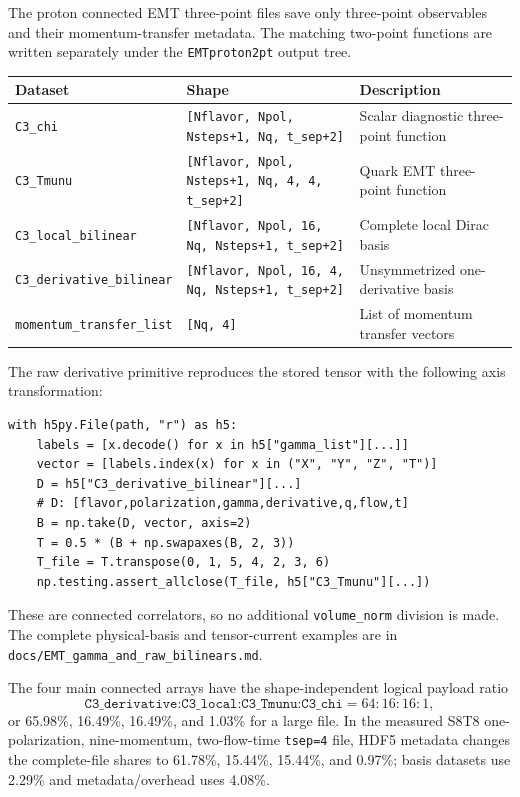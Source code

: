 \documentclass[11pt,a4paper]{article}
\newcommand{\code}[1]{\texttt{#1}}
\begin{document}
The proton connected EMT three-point files save only three-point observables and
their momentum-transfer metadata.  The matching two-point functions are written
separately under the \texttt{EMTproton2pt} output tree.

\begin{center}
\small
\begin{tabular}{p{}p{}p{}}
\toprule
Dataset & Shape & Description \\
\midrule
\texttt{C3\_chi} & \texttt{[Nflavor, Npol, Nsteps+1, Nq, t\_sep+2]}
                  & Scalar diagnostic three-point function \\
\texttt{C3\_Tmunu} & \texttt{[Nflavor, Npol, Nsteps+1, Nq, 4, 4, t\_sep+2]}
                    & Quark EMT three-point function \\
\texttt{C3\_local\_bilinear} & \texttt{[Nflavor, Npol, 16, Nq, Nsteps+1, t\_sep+2]}
                    & Complete local Dirac basis \\
\texttt{C3\_derivative\_bilinear} & \texttt{[Nflavor, Npol, 16, 4, Nq, Nsteps+1, t\_sep+2]}
                    & Unsymmetrized one-derivative basis \\
\texttt{momentum\_transfer\_list} & \texttt{[Nq, 4]}
                                   & List of momentum transfer vectors \\
\bottomrule
\end{tabular}
\end{center}

The raw derivative primitive reproduces the stored tensor with the following
axis transformation:
\begin{verbatim}
with h5py.File(path, "r") as h5:
    labels = [x.decode() for x in h5["gamma_list"][...]]
    vector = [labels.index(x) for x in ("X", "Y", "Z", "T")]
    D = h5["C3_derivative_bilinear"][...]
    # D: [flavor,polarization,gamma,derivative,q,flow,t]
    B = np.take(D, vector, axis=2)
    T = 0.5 * (B + np.swapaxes(B, 2, 3))
    T_file = T.transpose(0, 1, 5, 4, 2, 3, 6)
    np.testing.assert_allclose(T_file, h5["C3_Tmunu"][...])
\end{verbatim}
These are connected correlators, so no additional \code{volume\_norm}
division is made.  The complete physical-basis and tensor-current examples are
in \code{docs/EMT\_gamma\_and\_raw\_bilinears.md}.

The four main connected arrays have the shape-independent logical payload
ratio
\begin{equation}
\code{C3\_derivative:C3\_local:C3\_Tmunu:C3\_chi}=64:16:16:1,
\end{equation}
or 65.98\%, 16.49\%, 16.49\%, and 1.03\% for a large file.  In the measured
S8T8 one-polarization, nine-momentum, two-flow-time \code{tsep=4} file, HDF5
metadata changes the complete-file shares to 61.78\%, 15.44\%, 15.44\%, and
0.97\%; basis datasets use 2.29\% and metadata/overhead uses 4.08\%.
\end{document}
